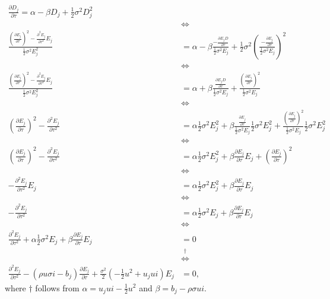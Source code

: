 \documentclass[12pt]{article}
\numberwithin{equation}{section}
\begin{document}
\begin{align*}
    \frac{\partial D_j}{\partial \tau}=\alpha-\beta D_j + \frac{1}{2}\sigma^2D_j^2\\
    &\iff\\
    \frac{\left ( \frac{\partial E_j}{\partial \tau}\right )^2-\frac{\partial^2 E_j}{\partial\tau^2 }E_j}{\frac{1}{2}\sigma^2 E_j^2}&=\alpha-\beta\frac{-\frac{\partial E_jD}{\partial \tau}}{\frac{1}{2}\sigma^2 E_j}+\frac{1}{2}\sigma^2 \left ( \frac{-\frac{\partial E_j}{\partial \tau}}{\frac{1}{2}\sigma^2 E_j}\right )^2\\
    &\iff\\
    \frac{\left ( \frac{\partial E_j}{\partial \tau}\right )^2-\frac{\partial^2 E_j}{\partial\tau^2 }E_j}{\frac{1}{2}\sigma^2 E_j^2}&=\alpha+\beta\frac{\frac{\partial E_jD}{\partial \tau}}{\frac{1}{2}\sigma^2 E_j}+ \frac{\left ( \frac{\partial E_j}{\partial \tau}\right ) ^2}{\frac{1}{2}\sigma^2 E_j}\\
    &\iff\\
    \left ( \frac{\partial E_j}{\partial \tau} \right )^2 - \frac{\partial^2 E_j}{\partial \tau^2} &= \alpha \frac{1}{2} \sigma^2 E_j^2 + \beta \frac{ \frac{\partial E_j}{\partial \tau} }{\frac{1}{2}\sigma^2E_j} \frac{1}{2}\sigma^2 E_j^2+ \frac{\left ( \frac{\partial E_j}{\partial \tau}\right ) ^2}{\frac{1}{2}\sigma^2 E_j}\frac{1}{2}\sigma^2 E_j^2\\
    &\iff\\
    \left ( \frac{\partial E_j}{\partial \tau} \right )^2 - \frac{\partial^2 E_j}{\partial \tau^2} &= \alpha \frac{1}{2} \sigma^2 E_j^2 + \beta \frac{\partial E_j}{\partial \tau}E_j+\left ( \frac{\partial E_j }{\partial \tau} \right )^2\\
    &\iff\\
    - \frac{\partial^2 E_j}{\partial \tau^2}E_j &= \alpha \frac{1}{2} \sigma^2 E_j^2 + \beta \frac{\partial E_j}{\partial \tau}E_j\\
    &\iff\\
    - \frac{\partial^2 E_j}{\partial \tau^2} &= \alpha \frac{1}{2} \sigma^2 E_j + \beta \frac{\partial E_j}{\partial \tau}E_j\\
    &\iff\\
    \frac{\partial^2 E_j}{\partial \tau^2}+\alpha \frac{1}{2} \sigma^2 E_j + \beta \frac{\partial E_j}{\partial \tau}E_j&=0\\
    &\overset{\dagger}{\iff}\\
    \frac{\partial^2 E_j}{\partial \tau^2} - (\rho u \sigma i - b_j) \frac{\partial E_j}{\partial \tau} + \frac{\sigma^2}{2} \left( -\frac{1}{2}u^2 + u_j ui \right) E_j &= 0,
\end{align*}
where $\dagger$ follows from $\alpha = u_j ui - \frac{1}{2}u^2$ and
$\beta=b_j-\rho \sigma u i$.
\end{document}
